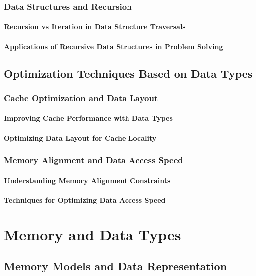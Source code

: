 \documentclass[12pt, oneside]{book}
\begin{document}
\subsection{Data Structures and Recursion}
\subsubsection{Recursion vs Iteration in Data Structure Traversals}
\subsubsection{Applications of Recursive Data Structures in Problem Solving}
\section{Optimization Techniques Based on Data Types}
\subsection{Cache Optimization and Data Layout}
\subsubsection{Improving Cache Performance with Data Types}
\subsubsection{Optimizing Data Layout for Cache Locality}
\subsection{Memory Alignment and Data Access Speed}
\subsubsection{Understanding Memory Alignment Constraints}
\subsubsection{Techniques for Optimizing Data Access Speed}

\chapter{Memory and Data Types}
\section{Memory Models and Data Representation}
\end{document}
